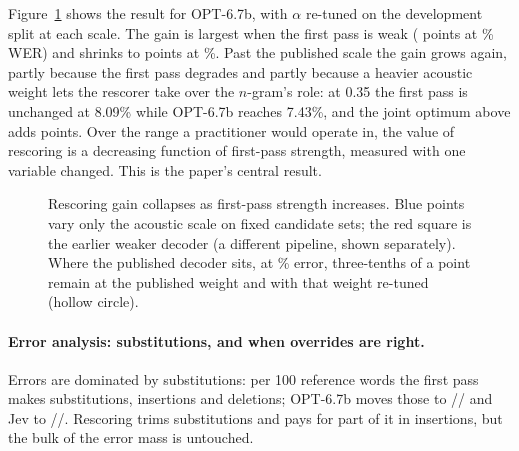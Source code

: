 \documentclass[11pt]{article}
\begin{document}
Figure~\ref{fig:gaincollapse} shows the result for OPT-6.7b, with $\alpha$ re-tuned on
the development split at each scale. The gain is largest when the first pass is weak
(\gainWeak{} points at \fpWeakSweep\% WER) and shrinks to \gainStrong{} points at
\werNone\%. Past the published scale the gain grows again, partly because the first pass
degrades and partly because a heavier acoustic weight lets the rescorer take over the
$n$-gram's role: at 0.35 the first pass is unchanged at 8.09\% while OPT-6.7b reaches
7.43\%, and the joint optimum above adds \gainOptJoint{} points. Over the range a practitioner would operate in, the value of
rescoring is a decreasing function of first-pass strength, measured with one variable
changed. This is the paper's central result.

\begin{figure}[t]
\centering
{}
\caption{Rescoring gain collapses as first-pass strength increases. Blue points vary only the acoustic scale on fixed candidate sets;
the red square is the earlier weaker decoder (a different pipeline, shown separately).
Where the published decoder sits, at \werNone\% error, three-tenths of a point remain at
the published weight and \gainOptJoint{} with that weight re-tuned (hollow circle).}
\label{fig:gaincollapse}
\end{figure}

\paragraph{Error analysis: substitutions, and when overrides are right.} Errors are
dominated by substitutions: per 100 reference words the first pass makes \subsNone{}
substitutions, \insNone{} insertions and \delsNone{} deletions; OPT-6.7b moves those to
\subsOpt{}/\insOpt{}/\delsOpt{} and Jev to \subsJev{}/\insJev{}/\delsJev{}. Rescoring
trims substitutions and pays for part of it in insertions, but the bulk of the error
mass is untouched.
\end{document}
